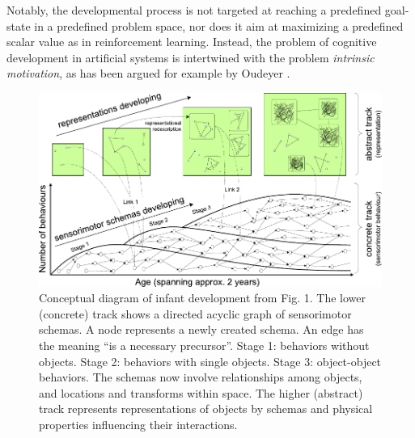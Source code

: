 \documentclass[runningheads]{llncs}
\begin{document}
Notably, the developmental process is not targeted at reaching a predefined goal-state in a predefined problem space, nor does it aim at maximizing a predefined scalar value as in reinforcement learning.
Instead, the problem of cognitive development in artificial systems is intertwined with the problem \textit{intrinsic motivation}, as has been argued for example by  
Oudeyer \cite{oudeyer_intrinsic_2007}. 


\begin{figure}
	\includegraphics[width=\textwidth]{Figure_1_guerin.pdf}
	\caption{Conceptual diagram of infant development from \cite{guerin_survey_2013} Fig. 1.
	The lower (concrete) track shows a directed acyclic graph of sensorimotor schemas. 
	A node represents a newly created schema. 
	An edge has the meaning ``is a necessary precursor''. 
    Stage 1: behaviors without objects. 
    Stage 2: behaviors with single objects. 
    Stage 3: object-object behaviors. The schemas now involve relationships among objects, and locations and transforms within space.
    The higher (abstract) track represents representations of objects by schemas and physical properties influencing their interactions.} 
	\label{fig:general}
\end{figure}
\end{document}
